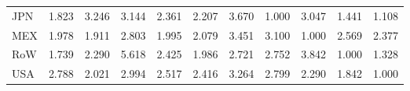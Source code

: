 \begin{table}[htbp]
\begin{tabular}{lcccccccccc}
  JPN & \textcolor[RGB]{207,134,48}{1.823} & \textcolor[RGB]{71,46,184}{3.246} & \textcolor[RGB]{77,50,178}{3.144} & \textcolor[RGB]{145,94,110}{2.361} & \textcolor[RGB]{161,104,94}{2.207} & \textcolor[RGB]{54,35,201}{3.670} & \textcolor[RGB]{230,148,26}{1.000} & \textcolor[RGB]{82,53,173}{3.047} & \textcolor[RGB]{222,144,33}{1.441} & \textcolor[RGB]{227,147,28}{1.108} \\ 
  MEX & \textcolor[RGB]{191,124,64}{1.978} & \textcolor[RGB]{196,127,59}{1.911} & \textcolor[RGB]{105,68,150}{2.803} & \textcolor[RGB]{186,120,69}{1.995} & \textcolor[RGB]{171,111,84}{2.079} & \textcolor[RGB]{59,38,196}{3.451} & \textcolor[RGB]{79,51,176}{3.100} & \textcolor[RGB]{230,148,26}{1.000} & \textcolor[RGB]{128,82,128}{2.569} & \textcolor[RGB]{143,92,112}{2.377} \\ 
  RoW & \textcolor[RGB]{214,139,41}{1.739} & \textcolor[RGB]{156,101,99}{2.290} & \textcolor[RGB]{18,12,237}{5.618} & \textcolor[RGB]{138,89,117}{2.425} & \textcolor[RGB]{189,122,66}{1.986} & \textcolor[RGB]{120,78,135}{2.721} & \textcolor[RGB]{115,74,140}{2.752} & \textcolor[RGB]{48,31,207}{3.842} & \textcolor[RGB]{230,148,26}{1.000} & \textcolor[RGB]{224,145,31}{1.328} \\ 
  USA & \textcolor[RGB]{110,71,145}{2.788} & \textcolor[RGB]{184,119,71}{2.021} & \textcolor[RGB]{87,56,168}{2.994} & \textcolor[RGB]{133,86,122}{2.517} & \textcolor[RGB]{140,91,115}{2.416} & \textcolor[RGB]{69,45,186}{3.264} & \textcolor[RGB]{107,69,148}{2.799} & \textcolor[RGB]{150,97,105}{2.290} & \textcolor[RGB]{201,130,54}{1.842} & \textcolor[RGB]{230,148,26}{1.000} \\ 
   \hline
\end{tabular}
\end{table}
